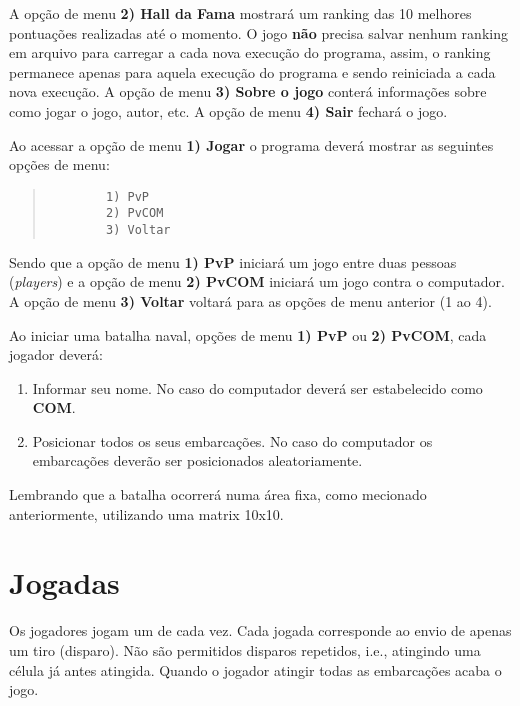 \documentclass[defesa,oneside]{ppginf}
\begin{document}
A opção de menu \textbf{2) Hall da Fama} mostrará um ranking das 10 melhores pontuações realizadas até o momento. O jogo \textbf{não} precisa salvar nenhum ranking em arquivo para carregar a cada nova execução do programa, assim, o ranking permanece apenas para aquela execução do programa e sendo reiniciada a cada nova execução. A opção de menu \textbf{3) Sobre o jogo} conterá informações sobre como jogar o jogo, autor, etc. A opção de menu \textbf{4) Sair} fechará o jogo.

Ao acessar a opção de menu \textbf{1) Jogar} o programa deverá mostrar as seguintes opções de menu: 

\begin{quote}
	\begin{footnotesize}
		\begin{verbatim}
		1) PvP
		2) PvCOM
		3) Voltar
		\end{verbatim}		
	\end{footnotesize}
\end{quote}

Sendo que a opção de menu \textbf{1) PvP} iniciará um jogo entre duas pessoas (\emph{players}) e a opção de menu \textbf{2) PvCOM} iniciará um jogo contra o computador. A opção de menu \textbf{3) Voltar} voltará para as opções de menu anterior (1 ao 4).

Ao iniciar uma batalha naval, opções de menu \textbf{1) PvP} ou \textbf{2) PvCOM}, cada jogador deverá:

\begin{enumerate}
	\item Informar seu nome. No caso do computador deverá ser estabelecido como \textbf{COM}.
	\item Posicionar todos os seus embarcações. No caso do computador os embarcações deverão ser posicionados aleatoriamente.	
\end{enumerate}

Lembrando que a batalha ocorrerá numa área fixa, como mecionado anteriormente, utilizando uma matrix 10x10.

\section{Jogadas}

Os jogadores jogam um de cada vez. Cada jogada corresponde ao envio de apenas um tiro (disparo).  Não são permitidos disparos repetidos, i.e., atingindo uma célula já antes atingida. Quando o jogador atingir todas as embarcações acaba o jogo.
\end{document}
